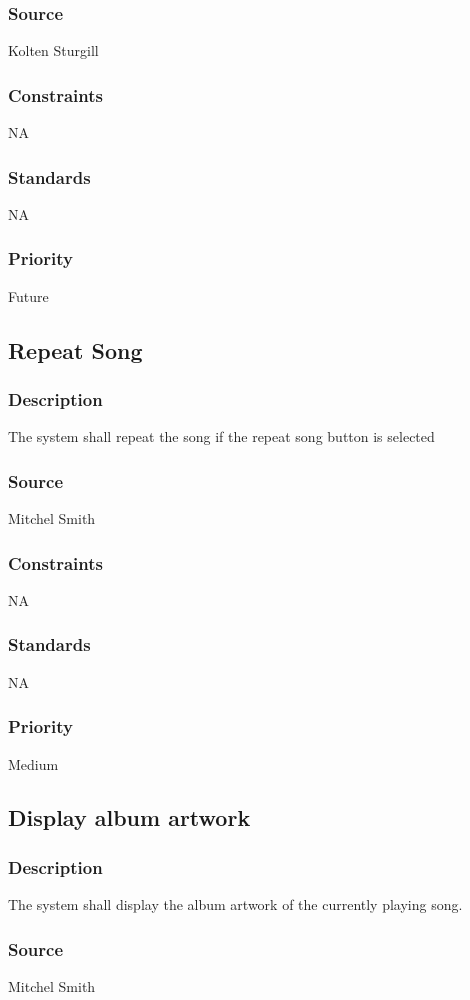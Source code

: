 \subsubsection{Source}
Kolten Sturgill
\subsubsection{Constraints}
NA
\subsubsection{Standards}
NA
\subsubsection{Priority}
Future

\subsection{Repeat Song}
\subsubsection{Description}
The system shall repeat the song if the repeat song button is selected 
\subsubsection{Source}
Mitchel Smith
\subsubsection{Constraints}
NA
\subsubsection{Standards}
NA
\subsubsection{Priority}
Medium


\subsection{Display album artwork}
\subsubsection{Description}
The system shall display the album artwork of the currently playing song.
\subsubsection{Source}
Mitchel Smith

